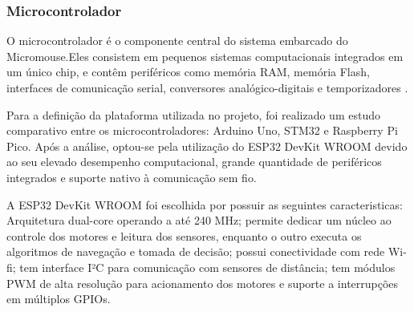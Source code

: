 \subsubsection{Microcontrolador}

O microcontrolador é o componente central do sistema embarcado do Micromouse.Eles consistem em pequenos sistemas computacionais integrados em um único chip, e contêm periféricos como memória RAM, memória Flash, interfaces de comunicação serial, conversores analógico-digitais e temporizadores \cite{chase_embarcados}.
    
Para a definição da plataforma utilizada no projeto, foi realizado um estudo comparativo entre os microcontroladores: Arduino Uno, STM32 e Raspberry Pi Pico. Após a análise, optou-se pela utilização do ESP32 DevKit WROOM devido ao seu elevado desempenho computacional, grande quantidade de periféricos integrados e suporte nativo à comunicação sem fio.

A ESP32 DevKit WROOM foi escolhida por possuir as seguintes caracteristicas: Arquitetura dual-core operando a até 240 MHz; permite dedicar um núcleo ao controle dos motores e leitura dos sensores, enquanto o outro executa os algoritmos de navegação e tomada de decisão; possui conectividade com rede Wi-fi; tem interface I²C para comunicação com sensores de distância; tem módulos PWM de alta resolução para acionamento dos motores e suporte a interrupções em múltiplos GPIOs.

    

    

